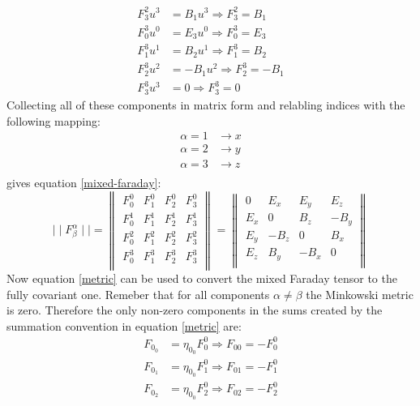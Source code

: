 \documentclass[9pt]{report}
\begin{document}
\begin{enumerate}
\[\begin{align}
      F^2_3 u^3 &= B_1 u^3 \Rightarrow F^2_3 = B_1 \\
      F^3_0 u^0 &= E_3 u^0 \Rightarrow F^3_0 = E_3 \\
      F^3_1 u^1 &= B_2 u^1 \Rightarrow F^3_1 = B_2 \\
      F^3_2 u^2 &= -B_1 u^2 \Rightarrow F^3_2 = -B_1 \\
      F^3_3 u^3 &= 0 \Rightarrow F^3_3 = 0
    \end{align}
    \]
    Collecting all of these components in matrix form and relabling indices with
    the following mapping:
    \[
      \begin{align}
        \alpha = 1 &\rightarrow x \\
        \alpha = 2 &\rightarrow y \\
        \alpha = 3 &\rightarrow z \\
      \end{align}
    \]
    gives equation \ref{mixed-faraday}:
    \[
       \mid  \mid F^\alpha_\beta  \mid \mid =
       \begin{Vmatrix}
         F^0_0 & F^0_1 & F^0_2 & F^0_3\\
         F^1_0 & F^1_1 & F^1_2 & F^1_3\\
         F^2_0 & F^2_1 & F^2_2 & F^2_3\\
         F^3_0 & F^3_1 & F^3_2 & F^3_3\\
       \end{Vmatrix}
       =
       \begin{Vmatrix}
         0 & E_x & E_y & E_z\\
         E_x & 0 & B_z & -B_y\\
         E_y & -B_z & 0 & B_x\\
         E_z & B_y & -B_x & 0\\
       \end{Vmatrix}
    \]
    Now equation \ref{metric} can be used to convert the mixed Faraday tensor
    to the fully covariant one. Remeber that for all components $\alpha \neq \beta$
    the Minkowski metric is zero. Therefore the only non-zero components in the
    sums created by the summation convention in equation \ref{metric} are:
    \[
      \begin{align}
        F_0_0 &= \eta_0_0 F_0^0 \Rightarrow F_{00} = -F^0_0 \\
        F_0_1 &= \eta_0_0 F_1^0 \Rightarrow F_{01} = -F^0_1\\
        F_0_2 &= \eta_0_0 F_2^0 \Rightarrow F_{02} = -F^0_2\\

\end{align}\]
\end{enumerate}
\end{document}
